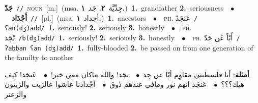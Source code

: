 \documentclass[10pt,a4paper,twoside]{article} %
\begin{document}
\begin{multicols}{2}
{\setlength\topsep{0pt}\textbf{\foreignlanguage{arabic}{جَدّ}}\ {\color{gray}\texttt{//}\color{black}}\ \textsc{noun}\ [m.]\ \color{gray}(msa. \foreignlanguage{arabic}{جِدِّيَّة}~\foreignlanguage{arabic}{\textbf{٢.}}  \foreignlanguage{arabic}{جَد}~\foreignlanguage{arabic}{\textbf{١.}})\color{black}\ \textbf{1.}~grandfather  \textbf{2.}~seriousness\ \ $\bullet$\ \ \setlength\topsep{0pt}\textbf{\foreignlanguage{arabic}{أَجْدَاد}}\ {\color{gray}\texttt{//}\color{black}}\ [pl.]\ \color{gray}(msa. \foreignlanguage{arabic}{أجداد}~\foreignlanguage{arabic}{\textbf{١.}})\color{black}\ \textbf{1.}~ancestors\ \ $\bullet$\ \ \textsc{ph.} \color{gray} \foreignlanguage{arabic}{عَنجَدّ}\color{black}\ {\color{gray}\texttt{/{\sffamily ʕan(dʒ)add}/}\color{black}}\ \textbf{1.}~seriously!  \textbf{2.}~seriously  \textbf{3.}~honestly\ \ $\bullet$\ \ \textsc{ph.} \color{gray} \foreignlanguage{arabic}{بْجَد}\color{black}\ {\color{gray}\texttt{/{\sffamily b(dʒ)add}/}\color{black}}\ \textbf{1.}~seriously!  \textbf{2.}~seriously  \textbf{3.}~honestly\ \ $\bullet$\ \ \textsc{ph.} \color{gray} \foreignlanguage{arabic}{أَبّاً عَن جَدّ}\color{black}\ {\color{gray}\texttt{/{\sffamily ʔabban ʕan (dʒ)add}/}\color{black}}\ \textbf{1.}~fully-blooded  \textbf{2.}~be passed on from one generation of the familty to another\  \begin{flushright}\color{gray}\foreignlanguage{arabic}{\textbf{\underline{\foreignlanguage{arabic}{أمثلة}}}: أنا فلسطيني مقاوِم أبّا عن جِد\ $\bullet$\ \  بجَد! والله ماكان معي خبر!\ $\bullet$\ \  عَنجَد! كيف هيك؟؟؟\ $\bullet$\ \  عَنجَد انهم نور ومافي عندهم ذوق\ $\bullet$\ \  أجْدادنا عاشوا عالزيت والزيتون والزعتر}\end{flushright}\color{black}} \vspace{2mm}


\end{multicols}
\end{document}
